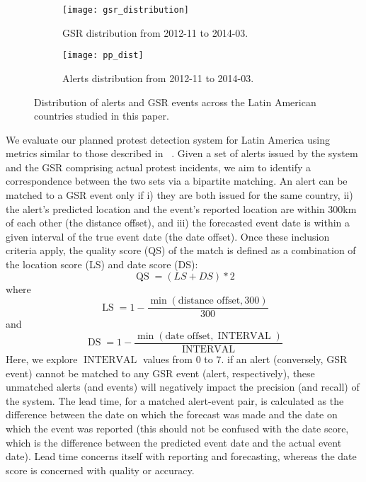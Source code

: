 \begin{figure*}
\centering
\begin{subfigure}{\columnwidth}
  \centering
  \texttt{[image: gsr\_distribution]} 
  \caption{GSR distribution from 2012-11 to 2014-03.}
  \label{fig:gsrdistribution}
\end{subfigure}%
\begin{subfigure}{\columnwidth}
  \centering
  \texttt{[image: pp\_dist]}
  \caption{Alerts distribution from 2012-11 to 2014-03.}
  \label{fig:ppdistribution}
\end{subfigure}
\caption{Distribution of alerts and GSR events across the Latin American countries studied in this paper.}
\label{fig:distribution}
\end{figure*}

We evaluate our planned protest detection system for Latin America using metrics similar to those described in 
~\cite{emberskdd}.
Given a set of alerts issued by the system and the GSR comprising actual protest incidents, we aim to identify
a correspondence between the two sets via a bipartite matching.
An alert can be matched to a GSR event only if i) they are both issued for the same country, 
ii) the alert's predicted location and the event's reported location are within 300km of each
other (the distance offset), and iii) the forecasted event date is within a given interval of the true event date (the date offset).
Once these inclusion criteria apply, the quality score (QS) of the match is defined as a combination of the
location score (LS) and date score (DS):
\small
\begin{equation}
    \operatorname{QS}= (LS + DS)*2
\end{equation}
\normalsize
\noindent
where
\small
\begin{equation}
    \operatorname{LS}=1 - \frac{\min(\textrm{distance offset}, 300)}{300}
\end{equation}
and 
\begin{equation}
    \operatorname{DS}=1 - \frac{\min(\textrm{date offset}, \operatorname{INTERVAL})}{\operatorname{INTERVAL}}
\end{equation}
\normalsize
Here, we explore $\operatorname{INTERVAL}$ values from $0$ to $7$.
if an alert (conversely, GSR event) cannot be matched to any GSR event (alert, respectively), these unmatched
alerts (and events) will negatively impact the precision (and recall) of the system. The lead time,
for a matched alert-event pair,
is calculated as the difference between the date on which the forecast was made and the date on which the event
was reported (this should not be confused with the date score, which is the difference between the
predicted event date and the actual event date). Lead time concerns itself with reporting and forecasting, whereas
the date score is concerned with quality or accuracy.

